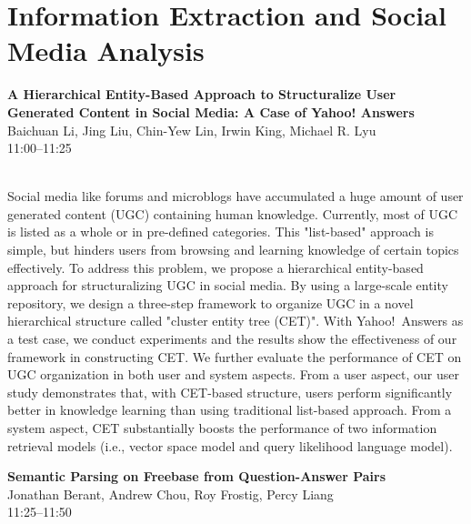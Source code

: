 \documentclass[twoside,makeidx]{book}
\begin{document}
\section{Information Extraction and Social Media Analysis}
\vspace{-1em}
\par\vspace{2em}\noindent%
\begin{minipage}{\linewidth}%
\begin{center}
\textbf{\normalsize A Hierarchical Entity-Based Approach to Structuralize User Generated Content in Social Media: A Case of Yahoo! Answers}\\
\normalsize  Baichuan Li,  Jing Liu,  Chin-Yew Lin,  Irwin King,  Michael R. Lyu\\
{\small 11:00--11:25}\\
\end{center}
\end{minipage}\\[0.5em]
\nopagebreak%
\noindent%
{\small Social media like forums and microblogs have accumulated a huge amount of user generated content (UGC) containing human knowledge. Currently, most of UGC is listed as a whole or in pre-defined categories. This "list-based" approach is simple, but hinders users  from browsing and learning knowledge of certain topics effectively. To address this problem, we propose a hierarchical entity-based approach for structuralizing UGC in social media. By using a large-scale entity repository, we design a three-step framework to organize  UGC in a novel hierarchical structure called "cluster entity tree (CET)". With Yahoo!~Answers as a test case, we conduct experiments and the results show the effectiveness of our framework in constructing CET. We further evaluate the performance of CET on UGC organization in both user and system aspects. From a user aspect, our user study demonstrates that, with CET-based structure, users perform significantly better in knowledge learning than using traditional list-based approach. From a system aspect, CET substantially boosts the performance of two information retrieval models (i.e., vector space model and query likelihood language model).}
\par\vspace{2em}\noindent%
\begin{minipage}{\linewidth}%
\begin{center}
\textbf{\normalsize Semantic Parsing on Freebase from Question-Answer Pairs}\\
\normalsize  Jonathan Berant,  Andrew Chou,  Roy Frostig,  Percy Liang\\
{\small 11:25--11:50}\\
\end{center}
\end{minipage}\\[0.5em]
\end{document}

